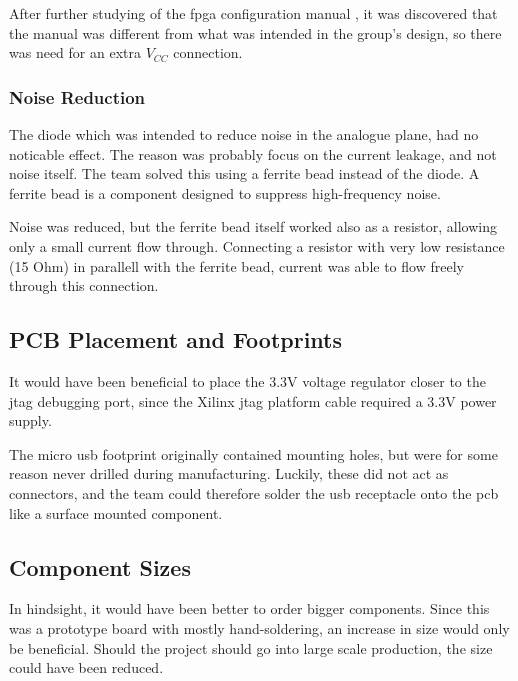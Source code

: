 After further studying of the \gls{fpga} configuration manual \cite[page 42]{fpga-configuration},
it was discovered that the manual was different from what was intended in the group's design,
so there was need for an extra \(V_{CC}\) connection.

\subsubsection{Noise Reduction}
The diode which was intended to reduce noise in the analogue plane, had no noticable effect.
The reason was probably focus on the current leakage, and not noise itself.
The team solved this using a ferrite bead instead of the diode.
A ferrite bead is a component designed to suppress high-frequency noise.

Noise was reduced, but the ferrite bead itself worked also as a resistor, allowing only a small current flow through.
Connecting a resistor with very low resistance (15 Ohm) in parallell with the ferrite bead, current was able to flow freely through this connection.

\subsection{PCB Placement and Footprints}
It would have been beneficial to place the 3.3V voltage regulator closer to the \gls{jtag} debugging port, since the Xilinx \gls{jtag} platform cable required a 3.3V power supply.

The micro \gls{usb} footprint originally contained mounting holes, but were for some reason never drilled during manufacturing.
Luckily, these did not act as connectors, and the team could therefore solder the \gls{usb} receptacle onto the \gls{pcb} like a surface mounted component.

\subsection{Component Sizes}
In hindsight, it would have been better to order bigger components.
Since this was a prototype board with mostly hand-soldering, an increase in size would only be beneficial.
Should the project should go into large scale production, the size could have been reduced.
